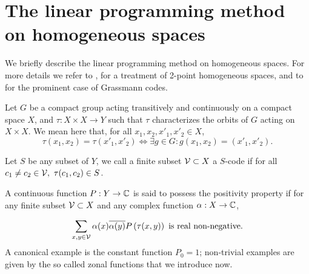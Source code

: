 \documentclass[10pt]{article}
\begin{document}
 \section{The linear programming method on homogeneous spaces} 
 
We briefly describe the linear programming method on homogeneous
spaces. For more details we refer to \cite{LEVEN}, \cite[Chapter 9]{CS} for a
treatment of 2-point homogeneous spaces, and to \cite{CHRISTINE1} for
the prominent case of Grassmann codes. 
  
 Let $G$ be a compact group acting transitively and continuously on a
 compact space $X$, and $\tau : X\times X  \to Y$ such that $\tau$ 
 characterizes the orbits of $G$ acting on $X\times X$. We mean here that, for all $x_1,x_2,x'_1,x'_2 \in X$,
\begin{equation*}
\tau(x_1,x_2)=\tau(x'_1,x'_2) \Leftrightarrow \exists  g \in G :
g(x_1,x_2)=(x'_1,x'_2).
\end{equation*}
     
  Let $S$ be any subset of $Y$, we call a finite subset $\mathcal V \subset
  X$ a $S$-code if for all
  $c_1 \ne c_2 \in \Code,\ \tau(c_1,c_2) \in S$. 
   
 A continuous function $P : Y \to \mathbb{C}$ is said to possess the positivity property 
 if for any finite subset
 $\mathcal V \subset X$ and any complex function $\alpha : X \to \mathbb{C}$, 
 
  $$\sum_{x,y \in \mathcal V} \alpha(x) \overline{\alpha(y)} P\left(\tau(x,y)\right)
  \textrm{ is real non-negative.}$$
  A canonical example is  the constant function $P_0=1$; non-trivial 
  examples are given by the so called zonal functions that we
  introduce now. 
\end{document}
